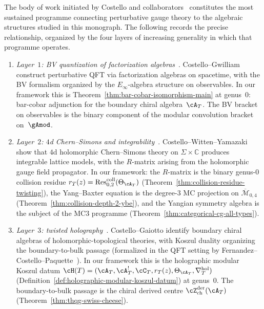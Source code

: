 The body of work initiated by Costello and
collaborators~\cite{CG17,CWY18,CostelloGaiotto2020,CL16,Costello2111,CostelloP2201,Costello2302,CPS2208,CPS2306,FernandezCostelloP24,BittlestonCostelloZeng24,BittlestonCostello25,CFG25}
constitutes the most sustained programme connecting perturbative
gauge theory to the algebraic structures studied in this monograph.
The following records the precise relationship, organized by the four
layers of increasing generality in which that programme operates.

\begin{remark}
\label{rem:costello-four-layers}

\begin{enumerate}[label=\textup{(\roman*)}]
\item \emph{Layer~$1$: BV quantization of factorization
 algebras}~\cite{CG17}.
 Costello--Gwilliam construct perturbative QFT
 via factorization algebras on spacetime, with the BV formalism
 organized by the $E_\infty$-algebra structure on observables.
 In our framework this is
 Theorem~\ref{thm:bar-cobar-isomorphism-main} at genus~$0$:
 bar-cobar adjunction for the boundary chiral algebra~$\cA_T$.
 The BV bracket on observables is the binary component of the
 modular convolution bracket on~$\gAmod$.

\item \emph{Layer~$2$: $4$d Chern--Simons and
 integrability}~\cite{CWY18}.
 Costello--Witten--Yamazaki show that $4$d holomorphic
 Chern--Simons theory on $\Sigma \times \mathbb{C}$ produces
 integrable lattice models, with the $R$-matrix arising from
 the holomorphic gauge field propagator. In our framework:
 the $R$-matrix is the binary genus-$0$ collision residue
 $r_T(z) = \operatorname{Res}^{\mathrm{coll}}_{0,2}(\Theta_{\cA_T})$
 (Theorem~\ref{thm:collision-residue-twisting}), the Yang--Baxter
 equation is the degree-$3$ MC projection on
 $\overline{\mathcal{M}}_{0,4}$
 (Theorem~\ref{thm:collision-depth-2-ybe}),
 and the Yangian symmetry algebra is the subject of the
 MC3 programme
 (Theorem~\ref{thm:categorical-cg-all-types}).

\item \emph{Layer~$3$: twisted
 holography}~\cite{CostelloGaiotto2020,Costello-1705.02500v1,FernandezCostelloP24}.
 Costello--Gaiotto identify boundary chiral algebras of
 holomorphic-topological theories, with Koszul duality
 organizing the boundary-to-bulk passage
 (formalized in the QFT setting
 by Fernandez--Costello--Paquette~\cite{FernandezCostelloP24}). In our framework
 this is the holographic modular Koszul datum
 $\cH(T) = (\cA_T, \cA_T^!, \cC_T, r_T(z),
 \Theta_{\cA_T}, \nabla^{\mathrm{hol}}_T)$
 (Definition~\ref{def:holographic-modular-koszul-datum})
 at genus~$0$. The boundary-to-bulk passage
 is the chiral derived centre
 $\cZ^{\mathrm{der}}_{\mathrm{ch}}(\cA_T)$
 (Theorem~\ref{thm:thqg-swiss-cheese}).


\end{enumerate}
\end{remark}
